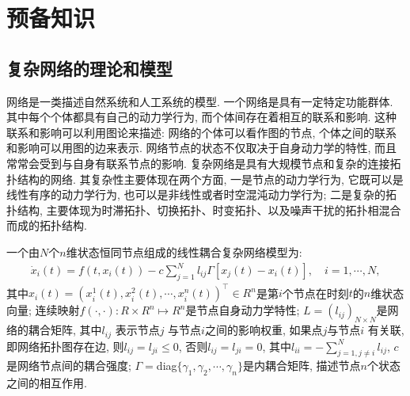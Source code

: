 \chapter{预备知识}\label{chap:math}
\section{复杂网络的理论和模型}
        网络是一类描述自然系统和人工系统的模型. 一个网络是具有一定特定功能群体. 其中每个个体都具有自己的动力学行为, 而个体间存在着相互的联系和影响. 这种联系和影响可以利用图论来描述: 网络的个体可以看作图的节点, 个体之间的联系和影响可以用图的边来表示. 网络节点的状态不仅取决于自身动力学的特性, 而且常常会受到与自身有联系节点的影响.
        复杂网络是具有大规模节点和复杂的连接拓扑结构的网络. 其复杂性主要体现在两个方面, 一是节点的动力学行为, 它既可以是线性有序的动力学行为, 也可以是非线性或者时空混沌动力学行为; 二是复杂的拓扑结构, 主要体现为时滞拓扑、切换拓扑、时变拓扑、以及噪声干扰的拓扑相混合而成的拓扑结构.

        一个由$N$个$n$维状态恒同节点组成的线性耦合复杂网络模型为:
        \begin{align*}
           \dot{x}_{i}(t)=f(t,x_{i}(t))-c\sum^N_{j=1}l_{ij}\Gamma[x_{j}(t)-x_{i}(t)], \quad i = 1,\cdots,N,
        \end{align*}
        其中$x_i(t)=(x_{i}^{1}(t),x_{i}^{2}(t),\cdots,x_{i}^{n}(t))^{\top}\in R^{n}$是第$i$个节点在时刻$t$的$n$维状态向量; 连续映射$f(\cdot,\cdot): R\times R^n\mapsto R^n$是节点自身动力学特性; $L=(l_{ij})_{N\times N}$是网络的耦合矩阵, 其中$l_{ij}$ 表示节点$j$ 与节点$i$之间的影响权重, 如果点$j$与节点$i$ 有关联, 即网络拓扑图存在边, 则$l_{ij}=l_{ji}\leq 0$, 否则$l_{ij}=l_{ji}=0$, 其中$l_{ii}=-\sum_{j=1,j\neq i}^N l_{ij}$, $c$ 是网络节点间的耦合强度; $\Gamma=$diag$\{\gamma_{1},\gamma_{2},\cdots,\gamma_{n}\}$是内耦合矩阵, 描述节点$n$个状态之间的相互作用.


